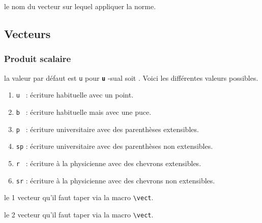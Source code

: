 \documentclass[12pt,a4paper]{book}
\makeatletter
\newcommand\env[1]{\texttt{#1}}
\newcommand\macro[1]{\env{\textbackslash{}#1}}
\theoremstyle{definition}
\newcommand\whyprefix[2]{%
	\textbf{\prefix{#1}}-#2%
}
\newcommand\prefix[1]{%
	\texttt{#1}%
}
\newcommand\inenglish{\@ifstar{\@inenglish@star}{\@inenglish@no@star}}
\newcommand\@inenglish@star[1]{%
	\emph{\og #1 \fg}%
}
\newcommand\@inenglish@no@star[1]{%
	\@inenglish@star{#1} en anglais%
}
\makeatother
\begin{document}
{{\IDarg{} le nom du vecteur sur lequel appliquer la norme.


\subsection{Vecteurs}

\subsubsection{Produit scalaire}




\IDoption{} la valeur par défaut est \verb+u+ pour \whyprefix{u}{sual} soit \inenglish{habituel}.  Voici les différentes valeurs possibles.

\begin{enumerate}
	\item \verb+u + : écriture habituelle avec un point.

	\item \verb+b + : écriture habituelle mais avec une puce.

	\medskip
	
	\item \verb+p + : écriture \og universitaire \fg{} avec des parenthèses extensibles.

	\item \verb+sp+ : écriture \og universitaire \fg{} avec des parenthèses non extensibles.

	\medskip
	
	\item \verb+r + : écriture \og à la physicienne \fg{} avec des chevrons extensibles.

	\item \verb+sr+ : écriture \og à la physicienne \fg{} avec des chevrons non extensibles.

%
%
\end{enumerate}

 le 1\ier{} vecteur qu'il faut taper via la macro \macro{vect}.

 le 2\ieme{} vecteur qu'il faut taper via la macro \macro{vect}.


}}
\end{document}
